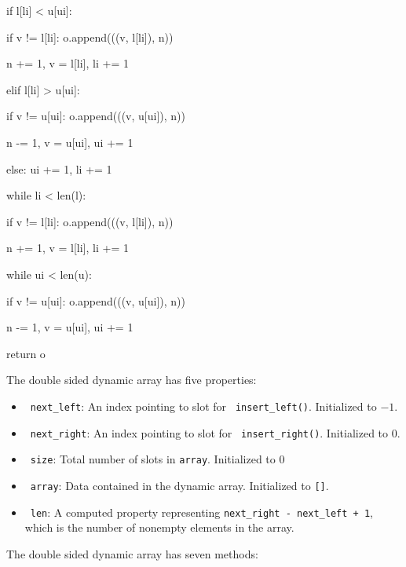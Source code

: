 \documentclass[12pt,twoside]{article}
\begin{document}
\begin{problems}
{\quad \quad         if l[li] < u[ui]:

\quad \quad \quad             if v != l[li]: o.append(((v, l[li]), n))

\quad \quad \quad             n += 1, v = l[li], li += 1

\quad \quad         elif l[li] > u[ui]:

\quad \quad \quad             if v != u[ui]: o.append(((v, u[ui]), n))

\quad \quad \quad             n -= 1, v = u[ui], ui += 1

\quad \quad         else: ui += 1, li += 1

\quad     while li < len(l):

\quad \quad         if v != l[li]: o.append(((v, l[li]), n))

\quad \quad         n += 1, v = l[li], li += 1

\quad     while ui < len(u):

\quad \quad         if v != u[ui]: o.append(((v, u[ui]), n))

\quad \quad         n -= 1, v = u[ui], ui += 1

\quad     return o
}

\newpage

 The double sided dynamic array has five properties:

    \begin{itemize}
        \item \ {\tt next\_left}: An index pointing to slot for {\tt
            insert\_left()}. Initialized to $ -1 $.
        \item \ {\tt next\_right}: An index pointing to slot for {\tt
            insert\_right()}. Initialized to $ 0 $.
        \item \ {\tt size}: Total number of slots in {\tt array}. Initialized
            to $ 0 $
        \item \ {\tt array}: Data contained in the dynamic array. Initialized
            to {\tt []}.
        \item \ {\tt len}: A computed property representing {\tt next\_right -
            next\_left + 1}, which is the number of nonempty elements in the
            array.
    \end{itemize}

    The double sided dynamic array has seven methods:


\end{problems}
\end{document}
